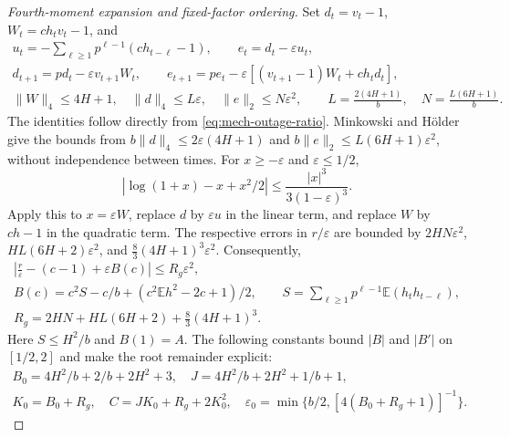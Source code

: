 \begin{proof}[Fourth-moment expansion and fixed-factor ordering]
Set \(d_t=v_t-1\), \(W_t=ch_tv_t-1\), and
\begin{equation}\label{eq:mech-outage-estimates}
 \begin{gathered}
 u_t=-\sum_{\ell\geq1}p^{\ell-1}(ch_{t-\ell}-1),\qquad
 e_t=d_t-\varepsilon u_t,\\
 d_{t+1}=pd_t-\varepsilon v_{t+1}W_t,\qquad
 e_{t+1}=pe_t-\varepsilon[(v_{t+1}-1)W_t+ch_td_t],\\
 \|W\|_4\leq4H+1,\quad \|d\|_4\leq L\varepsilon,\quad
 \|e\|_2\leq N\varepsilon^2,\qquad
 L=\frac{2(4H+1)}b,\quad N=\frac{L(6H+1)}b.
 \end{gathered}
\end{equation}
The identities follow directly from \eqref{eq:mech-outage-ratio}. Minkowski and H\"older give the bounds from
\(b\|d\|_4\leq2\varepsilon(4H+1)\) and
\(b\|e\|_2\leq L(6H+1)\varepsilon^2\), without independence between times.
For \(x\geq-\varepsilon\) and \(\varepsilon\leq1/2\),
\begin{equation}\label{eq:mech-outage-taylor}
 |\log(1+x)-x+x^2/2|\leq\frac{|x|^3}{3(1-\varepsilon)^3}.
\end{equation}
Apply this to \(x=\varepsilon W\), replace \(d\) by \(\varepsilon u\) in the linear term, and replace \(W\) by \(ch-1\) in the quadratic term. The respective errors in \(r/\varepsilon\) are bounded by
\(2HN\varepsilon^2\), \(HL(6H+2)\varepsilon^2\), and \(\tfrac83(4H+1)^3\varepsilon^2\). Consequently,
\begin{equation}\label{eq:mech-outage-rate}
 \begin{gathered}
 \left|\frac r\varepsilon-(c-1)+\varepsilon B(c)\right|
 \leq R_g\varepsilon^2,\\
 B(c)=c^2S-c/b+(c^2\mathbb E h^2-2c+1)/2,\qquad
 S=\sum_{\ell\geq1}p^{\ell-1}\mathbb E(h_th_{t-\ell}),\\
 R_g=2HN+HL(6H+2)+\tfrac83(4H+1)^3.
 \end{gathered}
\end{equation}
Here \(S\leq H^2/b\) and \(B(1)=A\). The following constants bound \(|B|\) and \(|B'|\) on \([1/2,2]\) and make the root remainder explicit:
\begin{equation}\label{eq:mech-outage-constants}
 \begin{gathered}
 B_0=4H^2/b+2/b+2H^2+3,\quad J=4H^2/b+2H^2+1/b+1,\\
 K_0=B_0+R_g,\quad C=JK_0+R_g+2K_0^2,\quad
 \varepsilon_0=\min\{b/2,[4(B_0+R_g+1)]^{-1}\}.
 \end{gathered}
\end{equation}

\end{proof}
